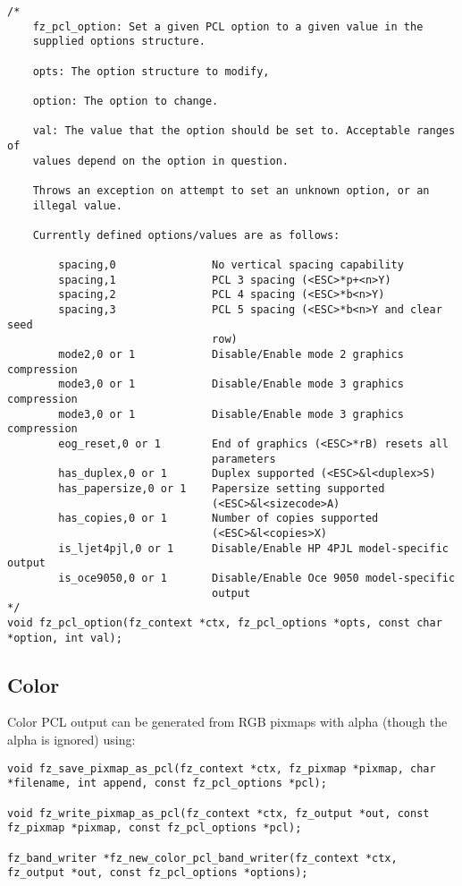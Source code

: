 \documentclass[oneside]{book}
\begin{document}
\begin{lstlisting}
/*
	fz_pcl_option: Set a given PCL option to a given value in the
	supplied options structure.

	opts: The option structure to modify,

	option: The option to change.

	val: The value that the option should be set to. Acceptable ranges of
	values depend on the option in question.

	Throws an exception on attempt to set an unknown option, or an
	illegal value.

	Currently defined options/values are as follows:

		spacing,0				No vertical spacing capability
		spacing,1				PCL 3 spacing (<ESC>*p+<n>Y)
		spacing,2				PCL 4 spacing (<ESC>*b<n>Y)
		spacing,3				PCL 5 spacing (<ESC>*b<n>Y and clear seed
								row)
		mode2,0 or 1			Disable/Enable mode 2 graphics compression
		mode3,0 or 1			Disable/Enable mode 3 graphics compression
		mode3,0 or 1			Disable/Enable mode 3 graphics compression
		eog_reset,0 or 1		End of graphics (<ESC>*rB) resets all
								parameters
		has_duplex,0 or 1		Duplex supported (<ESC>&l<duplex>S)
		has_papersize,0 or 1	Papersize setting supported 
								(<ESC>&l<sizecode>A)
		has_copies,0 or 1		Number of copies supported
								(<ESC>&l<copies>X)
		is_ljet4pjl,0 or 1		Disable/Enable HP 4PJL model-specific output
		is_oce9050,0 or 1		Disable/Enable Oce 9050 model-specific
								output
*/
void fz_pcl_option(fz_context *ctx, fz_pcl_options *opts, const char *option, int val);
\end{lstlisting}

\subsection{Color}

Color PCL output can be generated from RGB pixmaps with alpha (though the alpha is ignored) using:

\begin{lstlisting}
void fz_save_pixmap_as_pcl(fz_context *ctx, fz_pixmap *pixmap, char *filename, int append, const fz_pcl_options *pcl);

void fz_write_pixmap_as_pcl(fz_context *ctx, fz_output *out, const fz_pixmap *pixmap, const fz_pcl_options *pcl);

fz_band_writer *fz_new_color_pcl_band_writer(fz_context *ctx, fz_output *out, const fz_pcl_options *options);
\end{lstlisting}
\end{document}
